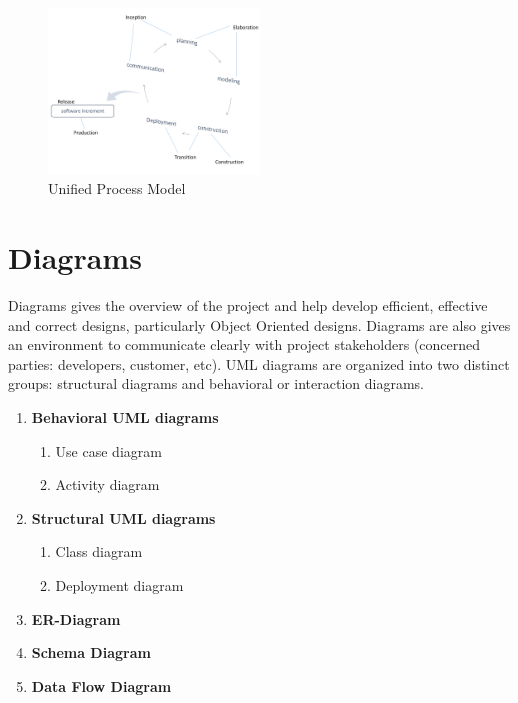 \documentclass[12pt]{report} %
\begin{document}
\begin{figure}[h]
	\begin{center}
	\includegraphics[width=0.5\textwidth]{pic/up_model.png}
	\end{center}
	\caption[]{Unified Process Model}
	\label{fig:up_model}
\end{figure}
\clearpage



\section{Diagrams}
Diagrams gives the overview of the project and help develop efficient, effective and correct designs, particularly Object Oriented designs. Diagrams are also gives an environment to communicate clearly with project stakeholders (concerned parties:  developers, customer, etc).
UML diagrams are organized into two distinct groups: structural diagrams and behavioral or interaction diagrams.\\

\renewcommand{\labelenumi}{\alph{enumi})}
\begin{enumerate}


	\item \textbf{Behavioral UML diagrams}
	\begin{enumerate}
		\item Use case diagram
		\item Activity diagram
	\end{enumerate}
	
	\item \textbf{Structural UML diagrams}
	\begin{enumerate}
		\item Class diagram
		\item Deployment diagram
	\end{enumerate}
	\item \textbf{ER-Diagram}
	\item \textbf{Schema Diagram}
	\item \textbf{Data Flow Diagram}
\end{enumerate}
\end{document}
